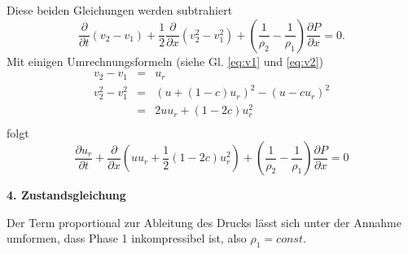 Diese beiden Gleichungen werden subtrahiert
\[
\frac{\partial}{\partial t} (v_2-v_1) + \frac{1}{2}
\frac{\partial}{\partial x} (v_2^2-v_1^2)+
\left(\frac{1}{\rho_2}-\frac{1}{\rho_1}\right)\frac{\partial
  P}{\partial x} = 0.
\]
Mit einigen Umrechnungsformeln  (siehe Gl. \ref{eq:v1} und \ref{eq:v2})
\begin{eqnarray*}
v_2 - v_1 &=& u_r\\
v_2^2-v_1^2 &=& \left(u + (1-c)u_r \right)^2 - \left(u - c u_r \right)^2\\
&=& 2 u u_r + (1-2c) u_r^2\\
\end{eqnarray*}
folgt
\begin{equation}
\frac{\partial u_r}{\partial t} +
\frac{\partial}{\partial x} \left(uu_r + \frac{1}{2}(1-2c)u_r^2 \right) +
\left(\frac{1}{\rho_2}-\frac{1}{\rho_1}\right)\frac{\partial
  P}{\partial x} = 0 \label{eq:ur_1d}
\end{equation}

{\bf 4. Zustandsgleichung}

Der Term proportional zur Ableitung des Drucks lässt sich unter der
Annahme umformen, dass Phase 1 inkompressibel ist, also $\rho_1 =
const$. 

